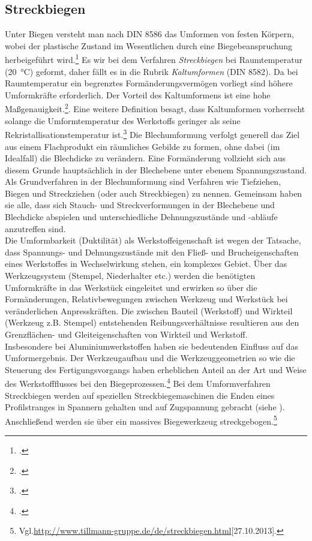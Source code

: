 \documentclass[12pt,a4paper,parskip]{scrartcl}
\begin{document}
	 	 	 	 

\subsection{Streckbiegen}
Unter Biegen versteht man nach DIN 8586 das Umformen von festen Körpern, wobei der plastische Zustand im Wesentlichen durch eine Biegebeanspruchung herbeigeführt wird.\footcite[Vgl.][376]{hu} Es wir bei dem Verfahren \emph{Streckbiegen} bei Raumtemperatur (\SI{20}{\degreeCelsius})  geformt, daher fällt es in die Rubrik \emph{Kaltumformen} (DIN 8582). Da bei Raumtemperatur ein begrenztes Formänderungsvermögen vorliegt sind höhere Umformkräfte erforderlich. Der Vorteil des Kaltumformens ist eine hohe Maßgenauigkeit.\footcite[Vgl.][8]{hu}. Eine weitere Definition besagt, dass Kaltumformen vorherrscht solange die Umformtemperatur des Werkstoffs geringer als seine Rekristallisationstemperatur ist.\footcite[Vgl.][187]{fu} Die Blechumformung verfolgt generell das Ziel aus einem Flachprodukt ein räumliches Gebilde zu formen, ohne dabei (im Idealfall) die Blechdicke zu verändern.  Eine Formänderung vollzieht sich aus diesem Grunde hauptsächlich in der Blechebene unter ebenem Spannungszustand. Als Grundverfahren in der Blechumformung sind Verfahren wie Tiefziehen, Biegen und Streckziehen (oder auch Streckbiegen) zu nennen. Gemeinsam haben sie alle, dass sich Stauch- und Streckverformungen in der Blechebene und Blechdicke abspielen und unterschiedliche Dehnungszustände und -abläufe anzutreffen sind.\\ Die Umformbarkeit (Duktilität) als Werkstoffeigenschaft ist wegen der Tatsache, dass  Spannungs- und Dehnungszustände mit den Fließ- und Brucheigenschaften eines Werkstoffes in Wechselwirkung stehen, ein komplexes Gebiet. Über das Werkzeugsystem (Stempel, Niederhalter etc.) werden die benötigten Umformkräfte in das Werkstück eingeleitet und erwirken so über die  Formänderungen, Relativbewegungen zwischen Werkzeug und Werkstück bei veränderlichen Anpresskräften. Die zwischen Bauteil (Werkstoff) und Wirkteil (Werkzeug z.B. Stempel) entstehenden Reibungsverhältnisse resultieren aus den  Grenzflächen- und Gleiteigenschaften von Wirkteil und Werkstoff.\\ Insbesondere bei Aluminiumwerkstoffen haben sie bedeutenden Einfluss auf das Umformergebnis. Der Werkzeugaufbau und die Werkzeuggeometrien so wie die Steuerung des Fertigungsvorgangs haben erheblichen Anteil an der Art und Weise des Werkstoffflusses bei den Biegeprozessen.\footcite[Vgl.][499]{aa}
Bei dem Umformverfahren Streckbiegen werden auf speziellen Streckbiegemaschinen die Enden eines Profilstranges in Spannern gehalten und auf  Zugspannung gebracht (siehe  ). Anschließend werden sie über ein massives Biegewerkzeug streckgebogen.\footnote{Vgl.\url{http://www.tillmann-gruppe.de/de/streckbiegen.html}[27.10.2013].} 
\end{document}
